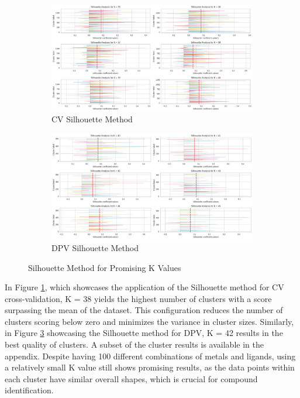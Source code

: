 \begin{figure}[h!]
  \centering
  	\begin{subfigure}{1.0\textwidth}
    \includegraphics[width=1.0\textwidth]{figures/cv_silhouette.png}
    \caption{CV Silhouette Method}
    \label{cv_silhouette}
    \end{subfigure}
    
    \begin{subfigure}{1.0\textwidth}
    \includegraphics[width=1.0\textwidth]{figures/dpv_silhouette.png}
    \caption{DPV Silhouette Method}
    \label{dpv_silhouette}
    \end{subfigure}
    
    \caption{Silhouette Method for Promising K Values}
\end{figure}
In Figure \ref{cv_silhouette}, which showcases the application of the Silhouette method for CV cross-validation, K = 38 yields the highest number of clusters with a score surpassing the mean of the dataset. This configuration reduces the number of clusters scoring below zero and minimizes the variance in cluster sizes.
Similarly, in Figure \ref{dpv_silhouette} showcasing the Silhouette method for DPV, K = 42 results in the best quality of clusters. A subset of the cluster results is available in the appendix. Despite having 100 different combinations of metals and ligands, using a relatively small K value still shows promising results, as the data points within each cluster have similar overall shapes, which is crucial for compound identification. 

